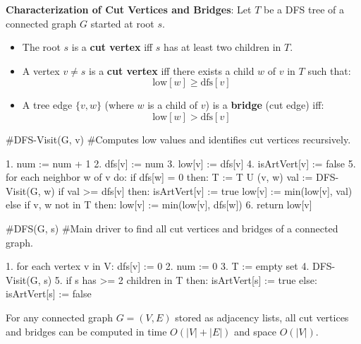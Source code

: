 \begin{theorem}
	\textbf{Characterization of Cut Vertices and Bridges}:
	Let $T$ be a DFS tree of a connected graph $G$ started at root $s$.
	\begin{itemize}
		\item The root $s$ is a \textbf{cut vertex} iff $s$ has at least two children in $T$.
		\item A vertex $v \neq s$ is a \textbf{cut vertex} iff there exists a child $w$ of $v$ in $T$ such that:
		      $$\text{low}[w] \ge \text{dfs}[v]$$
		\item A tree edge $\{v, w\}$ (where $w$ is a child of $v$) is a \textbf{bridge} (cut edge) iff:
		      $$\text{low}[w] > \text{dfs}[v]$$
	\end{itemize}
\end{theorem}

\begin{algorithm}
	#DFS-Visit(G, v)
	#Computes low values and identifies cut vertices recursively.

	1. num := num + 1
	2. dfs[v] := num
	3. low[v] := dfs[v]
	4. isArtVert[v] := false
	5. for each neighbor w of v do:
	if dfs[w] = 0 then:
	T := T U {(v, w)}
	val := DFS-Visit(G, w)
	if val >= dfs[v] then:
	isArtVert[v] := true
	low[v] := min(low[v], val)
	else if {v, w} not in T then:
	low[v] := min(low[v], dfs[w])
	6. return low[v]
\end{algorithm}

\begin{algorithm}
	#DFS(G, s)
	#Main driver to find all cut vertices and bridges of a connected graph.

	1. for each vertex v in V:
	dfs[v] := 0
	2. num := 0
	3. T := empty set
	4. DFS-Visit(G, s)
	5. if s has >= 2 children in T then:
	isArtVert[s] := true
	else:
	isArtVert[s] := false
\end{algorithm}

\begin{theorem}
	For any connected graph $G = (V, E)$ stored as adjacency lists, all cut vertices and bridges can be computed in time $O(|V| + |E|)$ and space $O(|V|)$.
\end{theorem}

